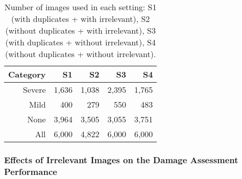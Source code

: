 \documentclass{iscram}
\begin{document}
\begin{table}[htb]
\caption{Number of images used in each setting: S1 (with duplicates + with irrelevant), S2 (without duplicates + with irrelevant), S3 (with duplicates + without irrelevant), S4 (without duplicates + without irrelevant).}
\centering
\begin{tabular}{rrrrr}
\toprule
Category&S1&S2&S3&S4\\
\midrule
 Severe & 1,636 &  1,038 & 2,395 & 1,765 \\
 Mild   & 400 &  279 &  550& 483 \\
 None   & 3,964 &  3,505  & 3,055 & 3,751 \\
\midrule
All & 6,000 & 4,822 & 6,000 & 6,000\\
\bottomrule
\end{tabular}
\label{tbl:im2train}
\end{table}\begin{table}[htb]
\caption{Precision, Recall, F1 and AUC scores: S1 (with duplicates + with irrelevant), S2 (without duplicates + with irrelevant), S3 (with duplicates + without irrelevant), S4 (without duplicates + without irrelevant).}
\centering
{}
\label{tbl:classification_report}
\end{table}\subsubsection{Effects of Irrelevant Images on the Damage Assessment Performance}%
\end{document}
